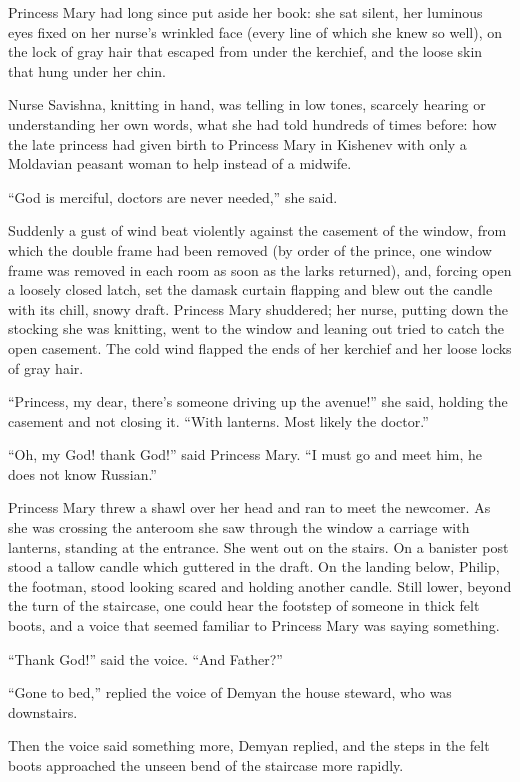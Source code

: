 Princess Mary had long since put aside her book: she sat silent,
her luminous eyes fixed on her nurse's wrinkled face (every line
of which she knew so well), on the lock of gray hair that escaped
from under the kerchief, and the loose skin that hung under her
chin.

Nurse Savishna, knitting in hand, was telling in low tones,
scarcely hearing or understanding her own words, what she had
told hundreds of times before: how the late princess had given
birth to Princess Mary in Kishenev with only a Moldavian peasant
woman to help instead of a midwife.

``God is merciful, doctors are never needed,'' she said.

Suddenly a gust of wind beat violently against the casement of
the window, from which the double frame had been removed (by
order of the prince, one window frame was removed in each room as
soon as the larks returned), and, forcing open a loosely closed
latch, set the damask curtain flapping and blew out the candle
with its chill, snowy draft.  Princess Mary shuddered; her nurse,
putting down the stocking she was knitting, went to the window
and leaning out tried to catch the open casement. The cold wind
flapped the ends of her kerchief and her loose locks of gray
hair.

``Princess, my dear, there's someone driving up the avenue!'' she
said, holding the casement and not closing it. ``With
lanterns. Most likely the doctor.''

``Oh, my God! thank God!'' said Princess Mary. ``I must go and
meet him, he does not know Russian.''

Princess Mary threw a shawl over her head and ran to meet the
newcomer.  As she was crossing the anteroom she saw through the
window a carriage with lanterns, standing at the entrance. She
went out on the stairs. On a banister post stood a tallow candle
which guttered in the draft. On the landing below, Philip, the
footman, stood looking scared and holding another candle. Still
lower, beyond the turn of the staircase, one could hear the
footstep of someone in thick felt boots, and a voice that seemed
familiar to Princess Mary was saying something.

``Thank God!'' said the voice. ``And Father?''

``Gone to bed,'' replied the voice of Demyan the house steward,
who was downstairs.

Then the voice said something more, Demyan replied, and the steps
in the felt boots approached the unseen bend of the staircase
more rapidly.

